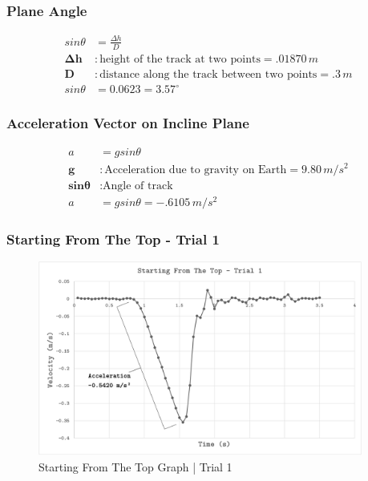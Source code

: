 
	\subsubsection{Plane Angle}
	\begin{align*}
		sin\theta &= \frac{\Delta h}{D} \\
		\boldsymbol{\Delta h} &: \text{height of the track at two points} = \boxed{.01870\,m} \\
		\textbf{D} &: \text{distance along the track between two points} = \boxed{.3\,m} \\
		sin\theta &= 0.0623 = \boxed{3.57^\circ}
	\end{align*}

	\subsubsection{Acceleration Vector on Incline Plane}
	
	\begin{align*}
		a&=gsin\theta \\
		\textbf{g} &: \text{Acceleration due to gravity on Earth} = \boxed{9.80\,m/s^2} \\
		\boldsymbol{sin\theta} &: \text{Angle of track} \\
		a&=gsin\theta = \boxed{-.6105\,m/s^2}
	\end{align*}

\subsubsection{Starting From The Top - Trial 1}
\begin{figure}[H]
	\begin{center}
		\includegraphics[width=0.95\textwidth]{cartg1.png}
	\end{center}
	\caption{Starting From The Top Graph | Trial 1}
	\label{fig:cartg1}
\end{figure} 

